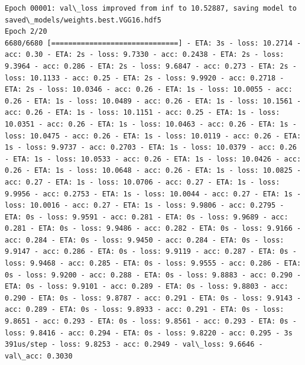 \documentclass[11pt]{article}
\begin{document}
\begin{Verbatim}[commandchars=\\\{\}]
Epoch 00001: val\_loss improved from inf to 10.52887, saving model to saved\_models/weights.best.VGG16.hdf5
Epoch 2/20
6680/6680 [==============================] - ETA: 3s - loss: 10.2714 - acc: 0.30 - ETA: 2s - loss: 9.7330 - acc: 0.2438 - ETA: 2s - loss: 9.3964 - acc: 0.286 - ETA: 2s - loss: 9.6847 - acc: 0.273 - ETA: 2s - loss: 10.1133 - acc: 0.25 - ETA: 2s - loss: 9.9920 - acc: 0.2718 - ETA: 2s - loss: 10.0346 - acc: 0.26 - ETA: 1s - loss: 10.0055 - acc: 0.26 - ETA: 1s - loss: 10.0489 - acc: 0.26 - ETA: 1s - loss: 10.1561 - acc: 0.26 - ETA: 1s - loss: 10.1151 - acc: 0.25 - ETA: 1s - loss: 10.0351 - acc: 0.26 - ETA: 1s - loss: 10.0463 - acc: 0.26 - ETA: 1s - loss: 10.0475 - acc: 0.26 - ETA: 1s - loss: 10.0119 - acc: 0.26 - ETA: 1s - loss: 9.9737 - acc: 0.2703 - ETA: 1s - loss: 10.0379 - acc: 0.26 - ETA: 1s - loss: 10.0533 - acc: 0.26 - ETA: 1s - loss: 10.0426 - acc: 0.26 - ETA: 1s - loss: 10.0648 - acc: 0.26 - ETA: 1s - loss: 10.0825 - acc: 0.27 - ETA: 1s - loss: 10.0706 - acc: 0.27 - ETA: 1s - loss: 9.9956 - acc: 0.2753 - ETA: 1s - loss: 10.0044 - acc: 0.27 - ETA: 1s - loss: 10.0016 - acc: 0.27 - ETA: 1s - loss: 9.9806 - acc: 0.2795 - ETA: 0s - loss: 9.9591 - acc: 0.281 - ETA: 0s - loss: 9.9689 - acc: 0.281 - ETA: 0s - loss: 9.9486 - acc: 0.282 - ETA: 0s - loss: 9.9166 - acc: 0.284 - ETA: 0s - loss: 9.9450 - acc: 0.284 - ETA: 0s - loss: 9.9147 - acc: 0.286 - ETA: 0s - loss: 9.9119 - acc: 0.287 - ETA: 0s - loss: 9.9468 - acc: 0.285 - ETA: 0s - loss: 9.9555 - acc: 0.286 - ETA: 0s - loss: 9.9200 - acc: 0.288 - ETA: 0s - loss: 9.8883 - acc: 0.290 - ETA: 0s - loss: 9.9101 - acc: 0.289 - ETA: 0s - loss: 9.8803 - acc: 0.290 - ETA: 0s - loss: 9.8787 - acc: 0.291 - ETA: 0s - loss: 9.9143 - acc: 0.289 - ETA: 0s - loss: 9.8933 - acc: 0.291 - ETA: 0s - loss: 9.8651 - acc: 0.293 - ETA: 0s - loss: 9.8561 - acc: 0.293 - ETA: 0s - loss: 9.8416 - acc: 0.294 - ETA: 0s - loss: 9.8220 - acc: 0.295 - 3s 391us/step - loss: 9.8253 - acc: 0.2949 - val\_loss: 9.6646 - val\_acc: 0.3030


\end{Verbatim}
\end{document}
